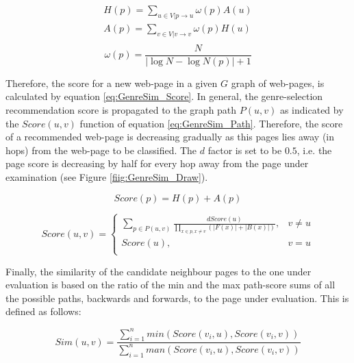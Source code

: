 \begin{equation}\label{eq:GenreSim_hub_authortities}
	\begin{array}{l}
		H(p) = \sum_{u \in V|p \to u} \omega(p) A(u) \\  
    	A(p) = \sum_{v \in V|v \to v} \omega(p) H(u) \\
    \end{array}
\end{equation}
\begin{equation}\label{eq:GenreSim_omega}
	\omega(p) = \frac{N}{|\log N - \log N(p) | + 1} 
\end{equation}

Therefore, the score for a new web-page in a given $G$ graph of web-pages, is calculated by equation \ref{eq:GenreSim_Score}. In general, the genre-selection recommendation score is propagated to the graph path $P(u,v)$ as indicated by the $Score(u, v)$ function of equation \ref{eq:GenreSim_Path}. Therefore, the score of a recommended web-page is decreasing gradually as this pages lies away (in hops) from the web-page to be classified. The $d$ factor is set to be $0.5$, i.e. the page score is decreasing by half for every hop away from the page under examination (see Figure \ref{fiig:GenreSim_Draw}). 

\begin{equation}\label{eq:GenreSim_Score}
	Score(p) = H(p) + A(p)
\end{equation}

\begin{equation}\label{eq:GenreSim_Path}
	Score(u, v) =
      \begin{cases}
      	\sum_{p \in P(u, v)} \frac{d Score(u)}{\prod_{x \in p, x  \neq v} (|F(x)| +|B(x)|)}, & v \neq u \\
        Score(u), & v = u \\ 
       \end{cases}
\end{equation}

Finally, the similarity of the candidate neighbour pages to the one under evaluation is based on the ratio of the min and the max path-score sums of all the possible paths, backwards and forwards, to the page under evaluation. This is defined as follows:

\begin{equation}\label{eq:GenreSim_Selection_Score}
	Sim(u, v) = \frac{\sum_{i=1}^{n} min(Score(v_{i}, u), Score(v_{i}, v))}{\sum_{i=1}^{n} man(Score(v_{i}, u), Score(v_{i}, v))}
\end{equation}


